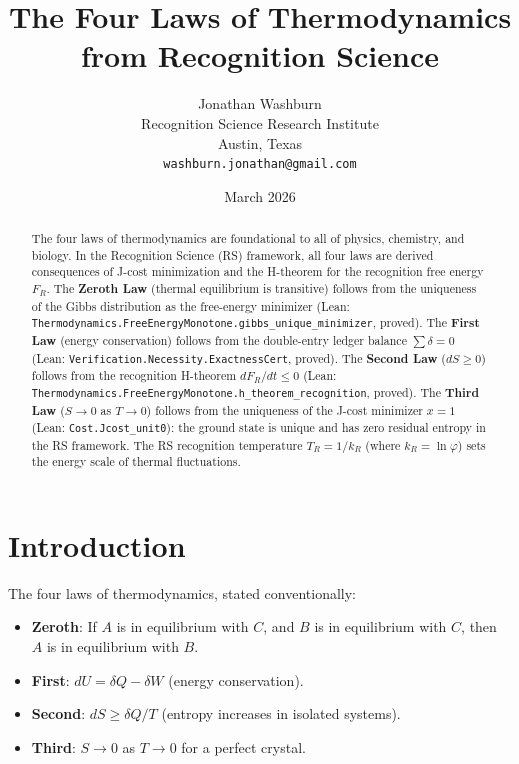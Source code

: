 \documentclass[12pt,a4paper]{article}
\title{The Four Laws of Thermodynamics\\
from Recognition Science}
\author{Jonathan Washburn\\
Recognition Science Research Institute\\
Austin, Texas\\
\texttt{washburn.jonathan@gmail.com}}
\date{March 2026}
\theoremstyle{definition}
\theoremstyle{remark}
\begin{document}
\maketitle

\begin{abstract}
The four laws of thermodynamics are foundational to all of physics,
chemistry, and biology.  In the Recognition Science (RS) framework,
all four laws are derived consequences of J-cost minimization and the
H-theorem for the recognition free energy $F_R$.  The \textbf{Zeroth Law}
(thermal equilibrium is transitive) follows from the uniqueness of the
Gibbs distribution as the free-energy minimizer (Lean:
\texttt{Thermodynamics.FreeEnergyMonotone.gibbs\_unique\_minimizer},
proved).  The \textbf{First Law} (energy conservation) follows from the
double-entry ledger balance $\sum \delta = 0$ (Lean:
\texttt{Verification.Necessity.ExactnessCert}, proved).  The
\textbf{Second Law} ($dS \geq 0$) follows from the recognition H-theorem
$dF_R/dt \leq 0$ (Lean: \texttt{Thermodynamics.FreeEnergyMonotone.h\_theorem\_recognition},
proved).  The \textbf{Third Law} ($S \to 0$ as $T \to 0$) follows from
the uniqueness of the J-cost minimizer $x = 1$ (Lean:
\texttt{Cost.Jcost\_unit0}): the ground state is unique and has zero
residual entropy in the RS framework.  The RS recognition temperature
$T_R = 1/k_R$ (where $k_R = \ln\varphi$) sets the energy scale of
thermal fluctuations.
\end{abstract}

\section{Introduction}

The four laws of thermodynamics, stated conventionally:
\begin{itemize}
  \item \textbf{Zeroth}: If $A$ is in equilibrium with $C$, and $B$ is in
        equilibrium with $C$, then $A$ is in equilibrium with $B$.
  \item \textbf{First}: $dU = \delta Q - \delta W$ (energy conservation).
  \item \textbf{Second}: $dS \geq \delta Q / T$ (entropy increases in
        isolated systems).
  \item \textbf{Third}: $S \to 0$ as $T \to 0$ for a perfect crystal.
\end{itemize}
\end{document}
